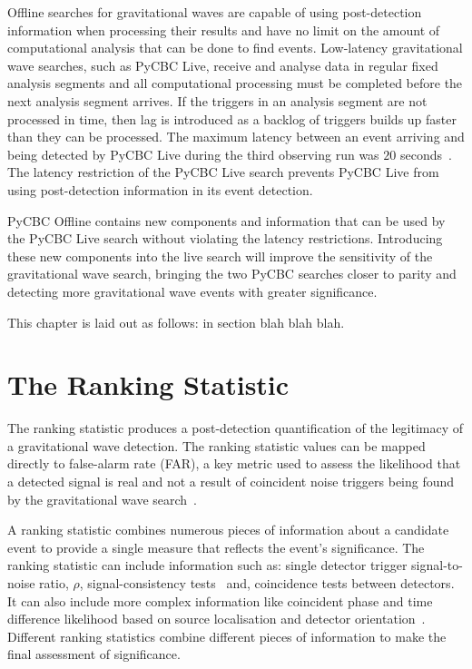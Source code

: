 Offline searches for gravitational waves are capable of using post-detection information when processing their results and have no limit on the amount of computational analysis that can be done to find events. Low-latency gravitational wave searches, such as PyCBC Live, receive and analyse data in regular fixed analysis segments and all computational processing must be completed before the next analysis segment arrives. If the triggers in an analysis segment are not processed in time, then lag is introduced as a backlog of triggers builds up faster than they can be processed. The maximum latency between an event arriving and being detected by PyCBC Live during the third observing run was $20$ seconds~\cite{PyCBC:2017}. The latency restriction of the PyCBC Live search prevents PyCBC Live from using post-detection information in its event detection.

PyCBC Offline contains new components and information that can be used by the PyCBC Live search without violating the latency restrictions. Introducing these new components into the live search will improve the sensitivity of the gravitational wave search, bringing the two PyCBC searches closer to parity and detecting more gravitational wave events with greater significance.

This chapter is laid out as follows: in section blah blah blah.

\section{\label{5:sec:ranking-stat}The Ranking Statistic}

The ranking statistic produces a post-detection quantification of the legitimacy of a gravitational wave detection. The ranking statistic values can be mapped directly to false-alarm rate (FAR), a key metric used to assess the likelihood that a detected signal is real and not a result of coincident noise triggers being found by the gravitational wave search~\cite{PyCBC_global:2020}.

A ranking statistic combines numerous pieces of information about a candidate event to provide a single measure that reflects the event's significance. The ranking statistic can include information such as: single detector trigger signal-to-noise ratio, $\rho$, signal-consistency tests~\cite{Allen_Chi:2005, rw_snr_eq:2012, PyCBC_sg:2018} and, coincidence tests between detectors. It can also include more complex information like coincident phase and time difference likelihood based on source localisation and detector orientation~\cite{PyCBC:2017, PyCBC_singles:2022}. Different ranking statistics combine different pieces of information to make the final assessment of significance.

